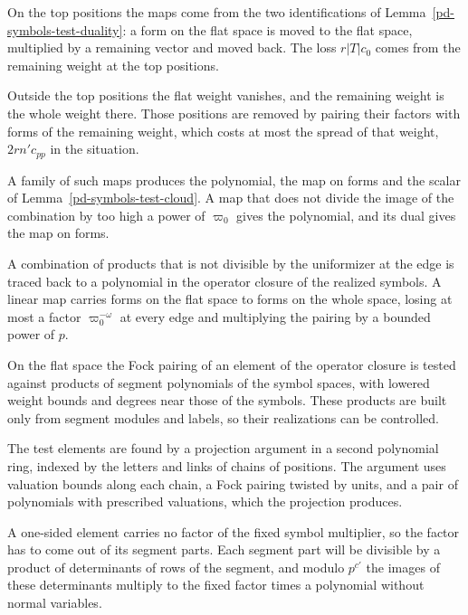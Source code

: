 On the top positions the maps come from the two identifications of Lemma~\ref{pd-symbols-test-duality}: a
form on the flat space is moved to the flat space, multiplied by a remaining vector and moved back. The loss
$r|T|c_0$ comes from the remaining weight at the top positions.

Outside the top positions the flat weight vanishes, and the remaining weight is the whole weight there. Those
positions are removed by pairing their factors with forms of the remaining weight, which costs at most the
spread of that weight, $2rn'c_{pp}$ in the situation.

A family of such maps produces the polynomial, the map on forms and the scalar of
Lemma~\ref{pd-symbols-test-cloud}. A map that does not divide the image of the combination by too high a power
of $\varpi_0$ gives the polynomial, and its dual gives the map on forms.

A combination of products that is not divisible by the uniformizer at the edge is traced back to a
polynomial in the operator closure of the realized symbols. A linear map carries forms on the flat
space to forms on the whole space, losing at most a factor $\varpi_0^{-\omega}$ at every edge and
multiplying the pairing by a bounded power of $p$.

On the flat space the Fock pairing of an element of the operator closure is tested against products of
segment polynomials of the symbol spaces, with lowered weight bounds and degrees near those of the symbols.
These products are built only from segment modules and labels, so their realizations can be controlled.

The test elements are found by a projection argument in a second polynomial ring, indexed by the letters
and links of chains of positions. The argument uses valuation bounds along each chain, a Fock pairing twisted
by units, and a pair of polynomials with prescribed valuations, which the projection produces.

A one-sided element carries no factor of the fixed symbol multiplier, so the factor has to come out of its segment
parts. Each segment part will be divisible by a product of determinants of rows of the segment, and modulo
$p^{c'}$ the images of these determinants multiply to the fixed factor times a polynomial without normal variables.

